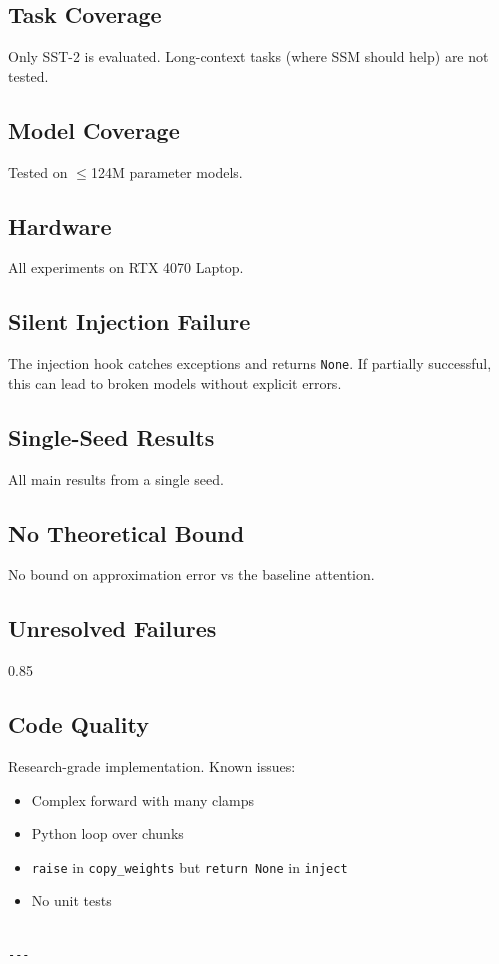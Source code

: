 \subsection{Task Coverage}

Only SST-2 is evaluated. Long-context tasks (where SSM should help) are 
not tested.

\subsection{Model Coverage}

Tested on $\le$124M parameter models.

\subsection{Hardware}

All experiments on RTX 4070 Laptop.

\subsection{Silent Injection Failure}

The injection hook catches exceptions and returns \texttt{None}. If partially 
successful, this can lead to broken models without explicit errors.

\subsection{Single-Seed Results}

All main results from a single seed.

\subsection{No Theoretical Bound}

No bound on approximation error vs the baseline attention.

\subsection{Unresolved Failures}

0.85

\subsection{Code Quality}

Research-grade implementation. Known issues:

\begin{itemize}
\item Complex forward with many clamps
\item Python loop over chunks
\item \texttt{raise} in \texttt{copy\_weights} but \texttt{return None} in \texttt{inject}
\item No unit tests
\end{itemize}
\begin{lstlisting}

---
\end{lstlisting}